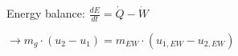 Energy balance:  
\( \frac{dE}{dt} = \dot{Q} - \dot{W} \)  

\( \rightarrow m_g \cdot (u_2 - u_1) = m_{EW} \cdot (u_{1,EW} - u_{2,EW}) \)